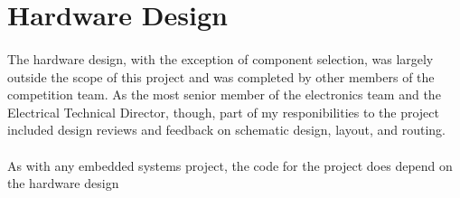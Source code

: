 \section{Hardware Design}

\paragraph{}
The hardware design, with the exception of component selection, was largely outside the scope of this project and was completed by other members of the competition team.
As the most senior member of the electronics team and the Electrical Technical Director, though, part of my responibilities to the project included design reviews and feedback on schematic design, layout, and routing.

\paragraph{}
As with any embedded systems project, the code for the project does depend on the hardware design